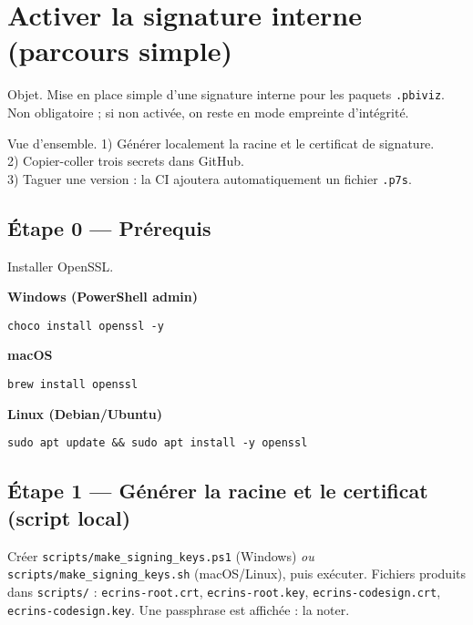 \section{Activer la signature interne (parcours simple)}
\label{ann:signature-procedure}

Objet.
Mise en place simple d’une signature interne pour les paquets \texttt{.pbiviz}. Non obligatoire ; si non activée, on reste en mode empreinte d’intégrité.

Vue d’ensemble.
1) Générer localement la racine et le certificat de signature.\\
2) Copier-coller trois secrets dans GitHub.\\
3) Taguer une version : la CI ajoutera automatiquement un fichier \texttt{.p7s}.

\subsection*{Étape 0 — Prérequis}
Installer OpenSSL.

\textbf{Windows (PowerShell admin)}
\begin{verbatim}
choco install openssl -y
\end{verbatim}

\textbf{macOS}
\begin{verbatim}
brew install openssl
\end{verbatim}

\textbf{Linux (Debian/Ubuntu)}
\begin{verbatim}
sudo apt update && sudo apt install -y openssl
\end{verbatim}

\subsection*{Étape 1 — Générer la racine et le certificat (script local)}
Créer \texttt{scripts/make\_signing\_keys.ps1} (Windows) \emph{ou} \texttt{scripts/make\_signing\_keys.sh} (macOS/Linux), puis exécuter. Fichiers produits dans \texttt{scripts/} :
\texttt{ecrins-root.crt}, \texttt{ecrins-root.key}, \texttt{ecrins-codesign.crt}, \texttt{ecrins-codesign.key}. Une passphrase est affichée : la noter.


